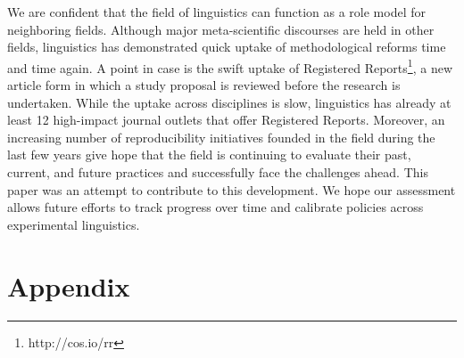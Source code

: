 \documentclass[]{elsarticle} %
\begin{document}
We are confident that the field of linguistics can function as a role model for neighboring fields. Although major meta-scientific discourses are held in other fields, linguistics has demonstrated quick uptake of methodological reforms time and time again. A point in case is the swift uptake of Registered Reports\footnote{http://cos.io/rr}, a new article form in which a study proposal is reviewed before the research is undertaken. While the uptake across disciplines is slow, linguistics has already at least 12 high-impact journal outlets that offer Registered Reports. Moreover, an increasing number of reproducibility initiatives founded in the field during the last few years give hope that the field is continuing to evaluate their past, current, and future practices and successfully face the challenges ahead. This paper was an attempt to contribute to this development. We hope our assessment allows future efforts to track progress over time and calibrate policies across experimental linguistics.

\hypertarget{appendix}{%
\section{Appendix}\label{appendix}}

\providecommand{\docline}[3]{\noalign{\global\setlength{\arrayrulewidth}{#1}}\arrayrulecolor[HTML]{#2}\cline{#3}}

\setlength{\tabcolsep}{2pt}

\renewcommand*{\arraystretch}{1.5}
\end{document}
